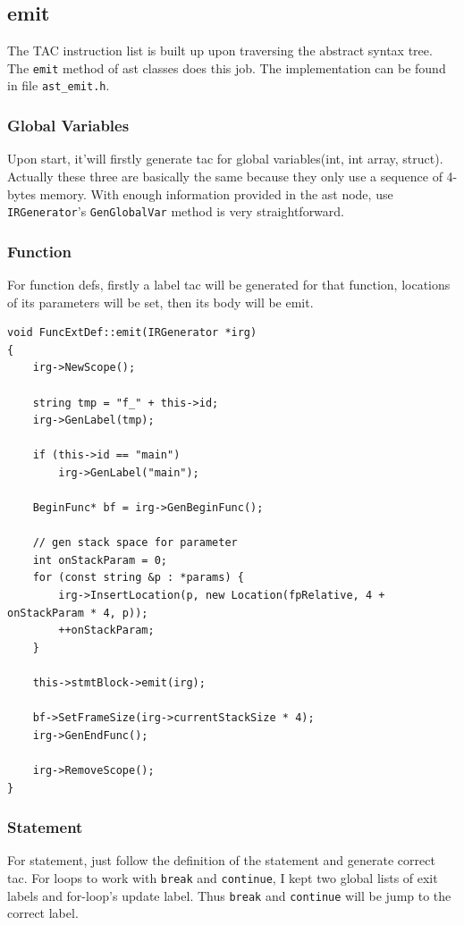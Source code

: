 \documentclass[11pt]{article}
\begin{document}
\subsection{emit}
\label{sec:orgheadline26}
The TAC instruction list is built up upon traversing the abstract syntax
tree. The \texttt{emit} method of ast classes does this job. The implementation can
be found in file \texttt{ast\_emit.h}.
\subsubsection{Global Variables}
\label{sec:orgheadline22}
Upon start, it'will firstly generate tac for global variables(int, int array,
struct). Actually these three are basically the same because they only use a
sequence of 4-bytes memory. With enough information provided in the ast node,
use \texttt{IRGenerator}'s \texttt{GenGlobalVar} method is very straightforward.
\subsubsection{Function}
\label{sec:orgheadline23}
For function defs, firstly a label tac will be generated for that function,
locations of its parameters will be set, then its body will be emit.
\begin{verbatim}
void FuncExtDef::emit(IRGenerator *irg)
{
    irg->NewScope();

    string tmp = "f_" + this->id;
    irg->GenLabel(tmp);

    if (this->id == "main")
        irg->GenLabel("main");

    BeginFunc* bf = irg->GenBeginFunc();

    // gen stack space for parameter
    int onStackParam = 0;
    for (const string &p : *params) {
        irg->InsertLocation(p, new Location(fpRelative, 4 + onStackParam * 4, p));
        ++onStackParam;
    }

    this->stmtBlock->emit(irg);

    bf->SetFrameSize(irg->currentStackSize * 4);
    irg->GenEndFunc();

    irg->RemoveScope();
}
\end{verbatim}

\subsubsection{Statement}
\label{sec:orgheadline24}
For statement, just follow the definition of the statement and generate
correct tac. For loops to work with \texttt{break} and \texttt{continue}, I kept two
global lists of exit labels and for-loop's update label. Thus \texttt{break} and
\texttt{continue} will be jump to the correct label.
\end{document}
